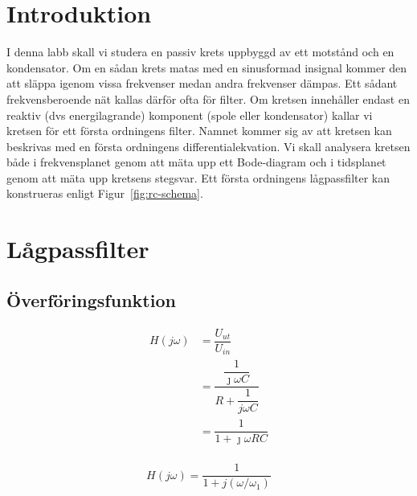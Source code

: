 %
%

\section{Introduktion}\label{intro}
I denna labb skall vi studera en passiv krets uppbyggd av ett motstånd och en
kondensator. Om en sådan krets matas med en sinusformad insignal kommer den att
släppa igenom vissa frekvenser medan andra frekvenser dämpas. Ett sådant
frekvensberoende nät kallas därför ofta för filter. Om kretsen innehåller
endast en reaktiv (dvs energilagrande) komponent (spole eller kondensator)
kallar vi kretsen för ett första ordningens filter. Namnet kommer sig av att
kretsen kan beskrivas med en första ordningens differentialekvation.  Vi skall
analysera kretsen både i frekvensplanet genom att mäta upp ett Bode-diagram och
i tidsplanet genom att mäta upp kretsens stegsvar.  Ett första ordningens
lågpassfilter kan konstrueras enligt Figur~\ref{fig:rc-schema}.

\section{Lågpassfilter}
\subsection{Överföringsfunktion}
\begin{equation}\label{eq:transfer}
    \begin{split}
        H(j\omega) &= \dfrac{U_{ut}}{U_{in}}                                      \\
                   &= \dfrac{\dfrac{1}{\jmath\omega C}}{R + \dfrac{1}{j\omega C}} \\
                   &= \dfrac{1}{1+\jmath\omega R C}                               \\
    \end{split}
\end{equation}

\begin{equation}
    H(j\omega) = \dfrac{1}{1+j(\omega/\omega_1)}
\end{equation}

